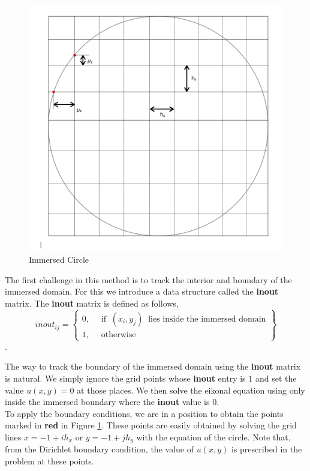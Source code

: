 \begin{figure}[h!]
	\centering
	\includegraphics[scale=0.5]{Images/circle-immerse.png}
	\caption{Immersed Circle}
	\label{fig:9}
	\end{figure}
	
	\noindent
	The first challenge in this method is to track the interior and boundary of the 
	immersed domain. For this we introduce a data structure called the \textbf{inout} matrix. The \textbf{inout} matrix is defined as follows,
	\begin{equation}
	inout_{ij} = 
	\begin{Bmatrix}
	0, &\;\; \text{if} \;\; (x_i,y_j) \;\; \text{lies inside the immersed domain}\\
	1, &\;\; \text{otherwise}
	\end{Bmatrix}
	\end{equation}.
	
	\noindent
	The way to track the boundary of the immersed domain using the \textbf{inout} matrix is natural. We simply ignore the grid points whose \textbf{inout} entry is $1$ and set the value $u(x,y) = 0$ at those places. We then solve the eikonal equation using only inside the immersed boundary where the \textbf{inout} value is $0$.\\
	
	\noindent
	To apply the boundary conditions, we are in a position to obtain the points marked in \textbf{red} in Figure \ref{fig:9}. These points are easily obtained by solving the grid lines $x = -1 + ih_x$ or $y = -1 + jh_y$ with the equation of the circle. Note that, from the Dirichlet boundary condition, the value of $u(x,y)$ is prescribed in the problem at these points. \\
	
